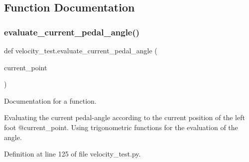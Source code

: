 \subsection{Function Documentation}
\mbox{\label{namespacevelocity__test_aa18f2ff9b77912b35fd8eb15408d564d}} 
\subsubsection{\texorpdfstring{evaluate\_current\_pedal\_angle()}{evaluate\_current\_pedal\_angle()}}
{\footnotesize\ttfamily def velocity\+\_\+test.\+evaluate\+\_\+current\+\_\+pedal\+\_\+angle (\begin{DoxyParamCaption}\item[{}]{current\+\_\+point }\end{DoxyParamCaption})}



Documentation for a function. 

Evaluating the current pedal-\/angle according to the current position of the left foot @current\+\_\+point. Using trigonometric functions for the evaluation of the angle. 

Definition at line 125 of file velocity\+\_\+test.\+py.


